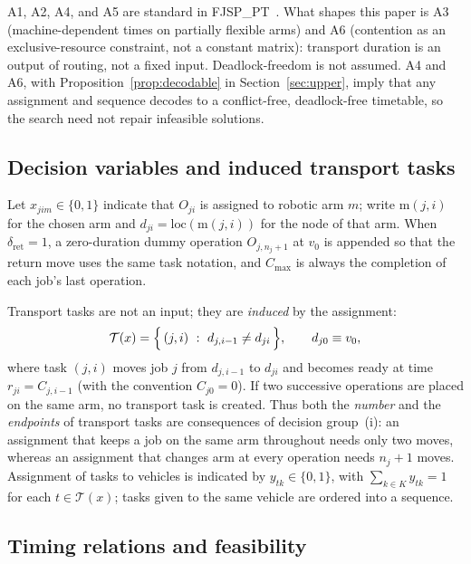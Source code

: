 A1, A2, A4, and A5 are standard in FJSP\_PT~\cite{xin2025review}.
What shapes this paper is A3 (machine-dependent times on partially flexible arms) and A6 (contention as an exclusive-resource constraint, not a constant matrix): transport duration is an output of routing, not a fixed input.
Deadlock-freedom is not assumed.
A4 and A6, with Proposition~\ref{prop:decodable} in Section~\ref{sec:upper}, imply that any assignment and sequence decodes to a conflict-free, deadlock-free timetable, so the search need not repair infeasible solutions.

\subsection{Decision variables and induced transport tasks}

Let $x_{jim}\in\{0,1\}$ indicate that $O_{ji}$ is assigned to robotic arm $m$; write $\mathrm{m}(j,i)$ for the chosen arm and $d_{ji}=\mathrm{loc}(\mathrm{m}(j,i))$ for the node of that arm.
When $\delta_{\mathrm{ret}}=1$, a zero-duration dummy operation $O_{j,n_j+1}$ at $v_0$ is appended so that the return move uses the same task notation, and $C_{\max}$ is always the completion of each job's last operation.

Transport tasks are not an input; they are \emph{induced} by the assignment:
\begin{equation}
\label{eq:tasks}
\mathcal{T}(x)=\Bigl\{\,(j,i)\ :\ d_{j,i-1}\neq d_{ji}\,\Bigr\},
\qquad d_{j0}\equiv v_0 ,
\end{equation}
where task $(j,i)$ moves job $j$ from $d_{j,i-1}$ to $d_{ji}$ and becomes ready at time $r_{ji}=C_{j,i-1}$ (with the convention $C_{j0}=0$).
If two successive operations are placed on the same arm, no transport task is created.
Thus both the \emph{number} and the \emph{endpoints} of transport tasks are consequences of decision group~(i): an assignment that keeps a job on the same arm throughout needs only two moves, whereas an assignment that changes arm at every operation needs $n_j+1$ moves.
Assignment of tasks to vehicles is indicated by $y_{tk}\in\{0,1\}$, with $\sum_{k\in K}y_{tk}=1$ for each $t\in\mathcal{T}(x)$; tasks given to the same vehicle are ordered into a sequence.

\subsection{Timing relations and feasibility}

